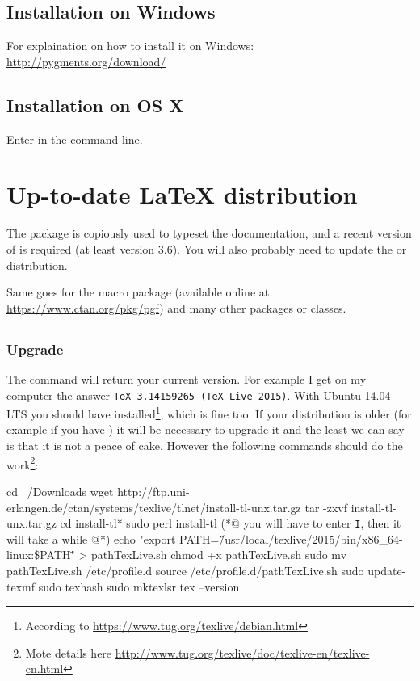 \documentclass{AMdocumentation}
\begin{document}
\subsection{Installation on Windows}

For explaination on how to install it on Windows: \url{http://pygments.org/download/}

\subsection{Installation on OS X}

Enter  in the command line.

\section{Up-to-date \LaTeX{} distribution}

The package  is copiously used to typeset the documentation, and
a recent version of  is required (at least version 3.6).
You will also probably need to update the \texlive or \miktex distribution. 

Same goes for the macro package  (available online at \url{https://www.ctan.org/pkg/pgf})
and many other packages or classes.

\subsection{\texlive}

\subsubsection{Upgrade \texlive}

The command  will return your current \texlive version. For example I get on my computer the answer \verb|TeX 3.14159265 (TeX Live 2015)|. With Ubuntu 14.04 LTS you should have  installed\footnote{According to \url{https://www.tug.org/texlive/debian.html}}, which is fine too. If your distribution is older (for example if you have ) it will be necessary to upgrade it and the least we can say is that it is not a peace of cake. However the following commands should do the work\footnote{Mote details here \url{http://www.tug.org/texlive/doc/texlive-en/texlive-en.html}}:

\begin{bashshell}[title={Bash script to install texlive 2015 on Ubuntu}]
cd ~/Downloads
wget http://ftp.uni-erlangen.de/ctan/systems/texlive/tlnet/install-tl-unx.tar.gz
tar -zxvf install-tl-unx.tar.gz
cd install-tl*
sudo perl install-tl
(*@ {\normalfont\normalcolor you will have to enter \texttt{I}, then it will take a while} @*)
echo "export PATH=\"/usr/local/texlive/2015/bin/x86_64-linux:\$PATH\"" > pathTexLive.sh
chmod +x pathTexLive.sh
sudo mv pathTexLive.sh /etc/profile.d
source /etc/profile.d/pathTexLive.sh
sudo update-texmf
sudo texhash
sudo mktexlsr
tex --version
\end{bashshell}
\end{document}
